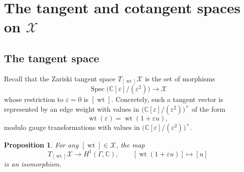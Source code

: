 \documentclass[dvipsnames,11pt]{article}
\newtheorem{proposition}[theorem]{Proposition}
\theoremstyle{definition}
\newcommand{\wt}{\operatorname{wt}}
\newcommand{\C}{{\mathbb C}}
\def\Spec{\operatorname{Spec}}
\begin{document}

\section{The tangent and cotangent spaces on \texorpdfstring{$\mathcal X$}{X}}
\label{sec:tangent_X}

\subsection{The tangent space}

Recall that the Zariski tangent space \(T_{[\wt]}\mathcal X\) is the set of morphisms
\[
\Spec\bigl(\C[\varepsilon]/(\varepsilon^2)\bigr)\to \mathcal X
\]
whose restriction to \(\varepsilon=0\) is \([\wt]\). Concretely, such a tangent vector is represented by an edge weight with values in
\(\bigl(\C[\varepsilon]/(\varepsilon^2)\bigr)^\times\) of the form
\[
\wt(\varepsilon)=\wt(1+\varepsilon u),
\]
modulo gauge transformations with values in
\(\bigl(\C[\varepsilon]/(\varepsilon^2)\bigr)^\times\).

\begin{proposition}\label{prop:xtan}
For any \([\wt]\in \mathcal X\), the map
\[
T_{[\wt]}\mathcal X \rightarrow H^1(\Gamma,\C),
\qquad
[\wt(1+\varepsilon u)] \mapsto [u]
\]
is an isomorphism.
\end{proposition}
\end{document}
